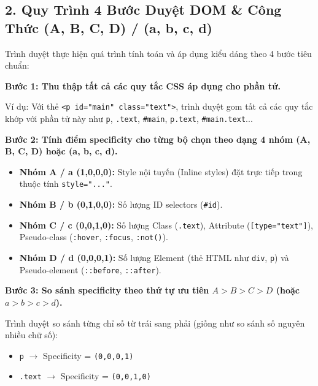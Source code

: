\documentclass[11pt,oneside]{book}
\newcommand{\codeinline}[1]{\textcolor{accentOrange}{\texttt{#1}}}
\begin{document}
\subsection{2. Quy Trình 4 Bước Duyệt DOM \& Công Thức (A, B, C, D) / (a, b, c, d)}

Trình duyệt thực hiện quá trình tính toán và áp dụng kiểu dáng theo 4 bước tiêu chuẩn:

\begin{conceptBox}
\textbf{Bước 1: Thu thập tất cả các quy tắc CSS áp dụng cho phần tử.} \par
Ví dụ: Với thẻ \codeinline{<p id="main" class="text">}, trình duyệt gom tất cả các quy tắc khớp với phần tử này như \codeinline{p}, \codeinline{.text}, \codeinline{\#main}, \codeinline{p.text}, \codeinline{\#main.text}...
\par\vspace{4pt}
\textbf{Bước 2: Tính điểm specificity cho từng bộ chọn theo dạng 4 nhóm (A, B, C, D) hoặc (a, b, c, d).}
\begin{itemize}[leftmargin=1.5em, itemsep=2pt, parsep=0pt]
    \item \textbf{Nhóm A / a (1,0,0,0):} Style nội tuyến (Inline styles) đặt trực tiếp trong thuộc tính \codeinline{style="..."}.
    \item \textbf{Nhóm B / b (0,1,0,0):} Số lượng ID selectors (\codeinline{\#id}).
    \item \textbf{Nhóm C / c (0,0,1,0):} Số lượng Class (\codeinline{.text}), Attribute (\codeinline{[type="text"]}), Pseudo-class (\codeinline{:hover}, \codeinline{:focus}, \codeinline{:not()}).
    \item \textbf{Nhóm D / d (0,0,0,1):} Số lượng Element (thẻ HTML như \codeinline{div}, \codeinline{p}) và Pseudo-element (\codeinline{::before}, \codeinline{::after}).
\end{itemize}
\par\vspace{4pt}
\textbf{Bước 3: So sánh specificity theo thứ tự ưu tiên $A > B > C > D$ (hoặc $a > b > c > d$).} \par
Trình duyệt so sánh từng chỉ số từ trái sang phải (giống như so sánh số nguyên nhiều chữ số):
\begin{itemize}[leftmargin=1.5em, itemsep=2pt, parsep=0pt]
    \item \codeinline{p} $\rightarrow$ Specificity = \codeinline{(0,0,0,1)}
    \item \codeinline{.text} $\rightarrow$ Specificity = \codeinline{(0,0,1,0)}

\end{itemize}
\end{conceptBox}
\end{document}
